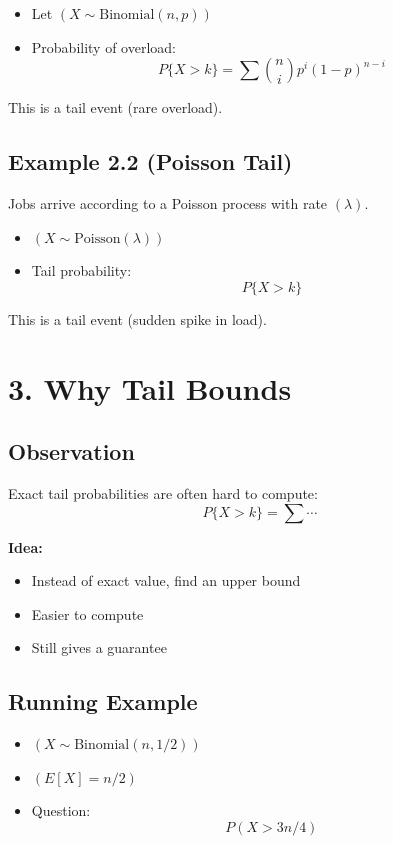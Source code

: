 \documentclass[11pt]{article}
\begin{document}
\begin{itemize}
\item Let $( X \sim \text{Binomial}(n,p) )$
\item Probability of overload:
\[
P\{X > k\} = \sum \binom{n}{i} p^i (1-p)^{n-i}
\]
\end{itemize}

This is a tail event (rare overload).

\subsection*{Example 2.2 (Poisson Tail)}

Jobs arrive according to a Poisson process with rate $( \lambda )$.

\begin{itemize}
\item $( X \sim \text{Poisson}(\lambda) )$
\item Tail probability:
\[
P\{X > k\}
\]
\end{itemize}

This is a tail event (sudden spike in load).

\section*{3. Why Tail Bounds}

\subsection*{Observation}

Exact tail probabilities are often hard to compute:
\[
P\{X > k\} = \sum \cdots
\]

\textbf{Idea:}

\begin{itemize}
\item Instead of exact value, find an upper bound
\item Easier to compute
\item Still gives a guarantee
\end{itemize}

\subsection*{Running Example}

\begin{itemize}
\item $( X \sim \text{Binomial}(n, 1/2) )$
\item $( E[X] = n/2 )$
\item Question:
\[
P(X > 3n/4)
\]
\end{itemize}
\end{document}
